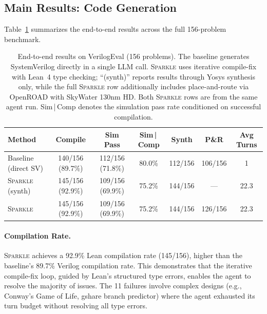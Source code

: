 \subsection{Main Results: Code Generation}
\label{sec:main_results}

Table~\ref{tab:main_results} summarizes the end-to-end results across the full 156-problem benchmark.

\begin{table}[t]
\centering
\caption{End-to-end results on VerilogEval (156 problems). The baseline generates SystemVerilog directly in a single LLM call. \textsc{Sparkle} uses iterative compile-fix with Lean~4 type checking; ``(synth)'' reports results through Yosys synthesis only, while the full \textsc{Sparkle} row additionally includes place-and-route via OpenROAD with SkyWater 130nm HD. Both \textsc{Sparkle} rows are from the same agent run. Sim\,|\,Comp denotes the simulation pass rate conditioned on successful compilation.}
\label{tab:main_results}
\small
\begin{tabular}{lcccccc}
\toprule
\textbf{Method} & \textbf{Compile} & \textbf{Sim Pass} & \textbf{Sim\,|\,Comp} & \textbf{Synth} & \textbf{P\&R} & \textbf{Avg Turns} \\
\midrule
Baseline (direct SV) & 140/156 (89.7\%) & 112/156 (71.8\%) & 80.0\% & 112/156 & 106/156 & 1 \\
\textsc{Sparkle} (synth) & 145/156 (92.9\%) & 109/156 (69.9\%) & 75.2\% & 144/156 & --- & 22.3 \\
\textsc{Sparkle} & 145/156 (92.9\%) & 109/156 (69.9\%) & 75.2\% & 144/156 & 126/156 & 22.3 \\
\bottomrule
\end{tabular}
\end{table}

\paragraph{Compilation Rate.}
\textsc{Sparkle} achieves a 92.9\% Lean compilation rate (145/156), higher than the baseline's 89.7\% Verilog compilation rate. This demonstrates that the iterative compile-fix loop, guided by Lean's structured type errors, enables the agent to resolve the majority of issues. The 11 failures involve complex designs (e.g., Conway's Game of Life, gshare branch predictor) where the agent exhausted its turn budget without resolving all type errors.


